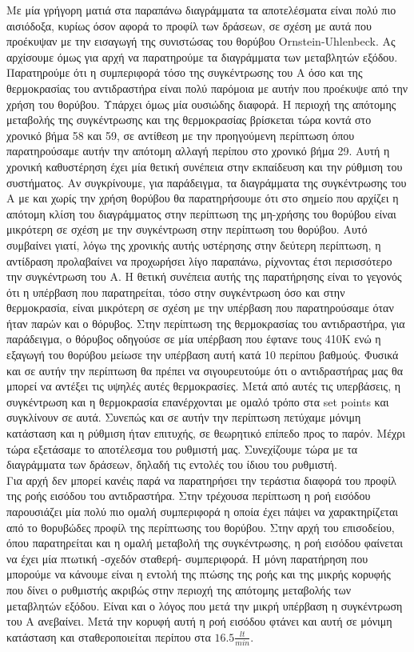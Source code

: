 \documentclass[11pt]{article} %
\numberwithin{equation}{subsection}
\begin{document}
Με μία γρήγορη ματιά στα παραπάνω διαγράμματα τα αποτελέσματα είναι πολύ πιο αισιόδοξα, κυρίως όσον αφορά το προφίλ των δράσεων, σε σχέση με αυτά που προέκυψαν με την εισαγωγή της συνιστώσας του θορύβου Ornstein-Uhlenbeck. Ας αρχίσουμε όμως για αρχή να παρατηρούμε τα διαγράμματα των μεταβλητών εξόδου.\\

Παρατηρούμε ότι η συμπεριφορά τόσο της συγκέντρωσης του Α όσο και της θερμοκρασίας του αντιδραστήρα είναι πολύ παρόμοια με αυτήν που προέκυψε από την χρήση του θορύβου. Υπάρχει όμως μία ουσιώδης διαφορά. Η περιοχή της απότομης μεταβολής της συγκέντρωσης και της θερμοκρασίας βρίσκεται τώρα κοντά στο χρονικό βήμα 58 και 59, σε αντίθεση με την προηγούμενη περίπτωση όπου παρατηρούσαμε αυτήν την απότομη αλλαγή περίπου στο χρονικό βήμα 29. Αυτή η χρονική καθυστέρηση έχει μία θετική συνέπεια στην εκπαίδευση και την ρύθμιση του συστήματος. Αν συγκρίνουμε, για παράδειγμα, τα διαγράμματα της συγκέντρωσης του Α με και χωρίς την χρήση θορύβου θα παρατηρήσουμε ότι στο σημείο που αρχίζει η απότομη κλίση του διαγράμματος στην περίπτωση της μη-χρήσης του θορύβου είναι μικρότερη σε σχέση με την συγκέντρωση στην περίπτωση του θορύβου. Αυτό συμβαίνει γιατί, λόγω της χρονικής αυτής υστέρησης στην δεύτερη περίπτωση, η αντίδραση προλαβαίνει να προχωρήσει λίγο παραπάνω, ρίχνοντας έτσι περισσότερο την συγκέντρωση του Α. Η θετική συνέπεια αυτής της παρατήρησης είναι το γεγονός ότι η υπέρβαση που παρατηρείται, τόσο στην συγκέντρωση όσο και στην θερμοκρασία, είναι μικρότερη σε σχέση με την υπέρβαση που παρατηρούσαμε όταν ήταν παρών και ο θόρυβος. Στην περίπτωση της θερμοκρασίας του αντιδραστήρα, για παράδειγμα, ο θόρυβος οδηγούσε σε μία υπέρβαση που έφτανε τους 410Κ ενώ η εξαγωγή του θορύβου μείωσε την υπέρβαση αυτή κατά 10 περίπου βαθμούς. Φυσικά και σε αυτήν την περίπτωση θα πρέπει να σιγουρευτούμε ότι ο αντιδραστήρας μας θα μπορεί να αντέξει τις υψηλές αυτές θερμοκρασίες. Μετά από αυτές τις υπερβάσεις, η συγκέντρωση και η θερμοκρασία επανέρχονται με ομαλό τρόπο στα set points και συγκλίνουν σε αυτά. Συνεπώς και σε αυτήν την περίπτωση πετύχαμε μόνιμη κατάσταση και η ρύθμιση ήταν επιτυχής, σε θεωρητικό επίπεδο προς το παρόν. Μέχρι τώρα εξετάσαμε το αποτέλεσμα του ρυθμιστή μας. Συνεχίζουμε τώρα με τα διαγράμματα των δράσεων, δηλαδή τις εντολές του ίδιου του ρυθμιστή.\\

Για αρχή δεν μπορεί κανέις παρά να παρατηρήσει την τεράστια διαφορά του προφίλ της ροής εισόδου του αντιδραστήρα. Στην τρέχουσα περίπτωση η ροή εισόδου παρουσιάζει μία πολύ πιο ομαλή συμπεριφορά η οποία έχει πάψει να χαρακτηρίζεται από το θορυβώδες προφίλ της περίπτωσης του θορύβου. Στην αρχή του επισοδείου, όπου παρατηρείται και η ομαλή μεταβολή της συγκέντρωσης, η ροή εισόδου φαίνεται να έχει μία πτωτική -σχεδόν σταθερή- συμπεριφορά. Η μόνη παρατήρηση που μπορούμε να κάνουμε είναι η εντολή της πτώσης της ροής και της μικρής κορυφής που δίνει ο ρυθμιστής ακριβώς στην περιοχή της απότομης μεταβολής των μεταβλητών εξόδου. Είναι και ο λόγος που μετά την μικρή υπέρβαση η συγκέντρωση του Α ανεβαίνει. Μετά την κορυφή αυτή η ροή εισόδου φτάνει και αυτή σε μόνιμη κατάσταση και σταθεροποιείται περίπου στα $16.5 \frac{lt}{min}$. \\
\end{document}
